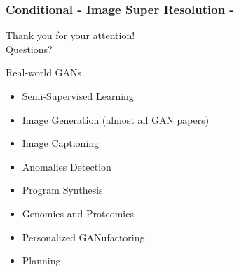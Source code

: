 \documentclass{beamer}
\begin{document}
{
\begin{frame}
\frametitle{Conditional - Image Super Resolution - \cite{ledigPhotoRealisticSingleImage2016}}
\end{frame}
}


\begin{frame}[standout]
\begin{center}
\Large	Thank you for your attention! \hfill \\
\Large	Questions?
\end{center}
\end{frame}

\appendix

\begin{frame}{Real-world GANs }
\begin{itemize}
\item Semi-Supervised Learning \citep{salimansImprovedTechniquesTraining2016a}
\item Image Generation (almost all GAN papers)
\item Image Captioning
\item Anomalies Detection \citep{zenatiEfficientGANBasedAnomaly2018a}
\item Program Synthesis \citep{ganinSynthesizingProgramsImages2018}
\item Genomics and Proteomics \citep{killoranGeneratingDesigningDNA2017} \citep{decaoMolGANImplicitGenerative2018}
\item Personalized GANufactoring \citep{hwangLearningHumanExpertise2018}
\item Planning
\end{itemize}
\end{frame}

\begin{frame}[allowframebreaks]


\end{frame}
\end{document}
